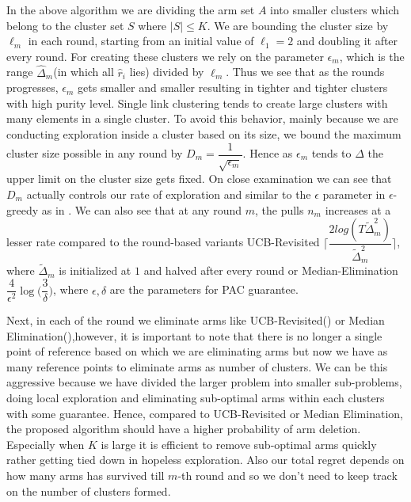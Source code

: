 In the above algorithm we are dividing the arm set $A$ into smaller clusters which belong to the cluster set $S$ where $|S|\leq K$. We are bounding the cluster size by $\ell_{m}$ in each round, starting from an initial value of $\ell_{1}=2$ and doubling it after every round. For creating these clusters we rely on the parameter $\epsilon_{m}$, which is the range $\hat{\Delta}_{m}$(in which all $\hat{r}_{i}$ lies) divided by $\ell_{m}$. 
Thus we see that as the rounds progresses, $\epsilon_{m}$ gets smaller and smaller resulting in tighter and tighter clusters with high purity level. Single link clustering tends to create large clusters with many elements in a single cluster. To avoid this behavior, mainly because we are conducting exploration inside a cluster based on its size, we bound the maximum cluster size possible in any round by $D_{m}=\dfrac{1}{\sqrt{\epsilon_{m}}}$. Hence as $\epsilon_{m}$ tends to $\Delta$ the upper limit on the cluster size gets fixed. On close examination we can see that $D_{m}$ actually controls our rate of exploration and similar to the $\epsilon$ parameter in $\epsilon$-greedy as in \cite{sutton1998reinforcement}. We can also see that at any round $m$, the pulls $n_{m}$ increases at a lesser rate compared to the round-based variants UCB-Revisited $\bigg\lceil \dfrac{2log(T\tilde{\Delta}_{m}^{2})}{\tilde{\Delta}_{m}^{2}} \bigg\rceil$, where $\tilde{\Delta}_{m}$ is initialized at $1$ and halved after every round or Median-Elimination $\dfrac{4}{\epsilon^{2}}\log\big(\dfrac{3}{\delta}\big)$, where $\epsilon,\delta$ are the parameters for PAC guarantee.

	Next, in each of the round we eliminate arms like UCB-Revisited(\cite{auer2010ucb}) or Median Elimination(\cite{even2006action}),however, it is important to note that there is no longer a single point of reference based on which we are eliminating arms but now we have as many reference points to eliminate arms as number of clusters. We can be this aggressive because we have divided the larger problem into smaller sub-problems, doing local exploration and eliminating sub-optimal arms within each clusters with some guarantee. Hence, compared to UCB-Revisited or Median Elimination, the proposed algorithm should have a higher probability of arm deletion. Especially when $K$ is large it is efficient to remove sub-optimal arms quickly rather getting tied down in hopeless exploration. Also our total regret depends on how many arms has survived till $m$-th round and so we don't need to keep track on the number of clusters formed.

